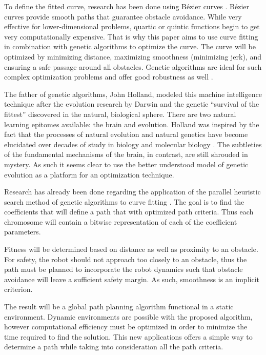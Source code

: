 \documentclass[twoside,letter,10pt]{article}
\begin{document}
\begin{multicols}{2}
To define the fitted curve, research has been done using Bézier curves \cite{choi10}. Bézier curves provide smooth paths that guarantee obstacle avoidance. While very effective for lower-dimensional problems, quartic or quintic functions begin to get very computationally expensive. That is why this paper aims to use curve fitting in combination with genetic algorithms to optimize the curve. The curve will be optimized by minimizing distance, maximizing smoothness (minimizing jerk), and ensuring a safe passage around all obstacles. Genetic algorithms are ideal for such complex optimization problems and offer good robustness as well \cite{zou12}.

The father of genetic algorithms, John Holland, modeled this machine intelligence technique after the evolution research by Darwin and the genetic ``survival of the fittest'' discovered in the natural, biological sphere. There are two natural learning epitomes available: the brain and evolution. Holland was inspired by the fact that the processes of natural evolution and natural genetics have become elucidated over decades of study in biology and molecular biology \cite{goldberg88}. The subtleties of the fundamental mechanisms of the brain, in contrast, are still shrouded in mystery. As such it seems clear to use the better understood model of genetic evolution as a platform for an optimization technique.

Research has already been done regarding the application of the parallel heuristic search method of genetic algorithms to curve fitting \cite{gulsen95,karr91,ismail08}. The goal is to find the coefficients that will define a path that with optimized path criteria. Thus each chromosome will contain a bitwise representation of each of the coefficient parameters.

Fitness will be determined based on distance as well as proximity to an obstacle. For safety, the robot should not approach too closely to an obstacle, thus the path must be planned to incorporate the robot dynamics such that obstacle avoidance will leave a sufficient safety margin. As such, smoothness is an implicit criterion.

The result will be a global path planning algorithm functional in a static environment. Dynamic environments are possible with the proposed algorithm, however computational efficiency must be optimized in order to minimize the time required to find the solution. This new applications offers a simple way to determine a path while taking into consideration all the path criteria.


\end{multicols}
\end{document}
